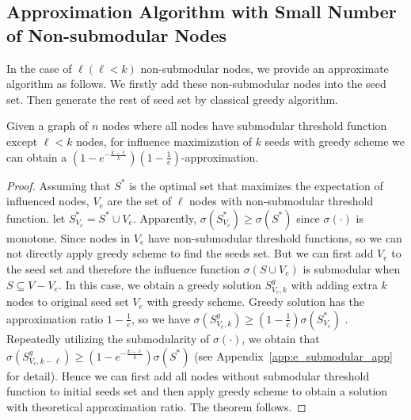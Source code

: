 \subsection{Approximation Algorithm with Small Number of Non-submodular Nodes}
In the case of $\ell (\ell<k)$ non-submodular nodes, we provide an approximate algorithm as follows. We firstly add these non-submodular nodes into the seed set. Then generate the rest of seed set by classical greedy algorithm.
\begin{theorem}\label{the:naive_greedy}
Given a graph of $n$ nodes where all nodes have submodular threshold function except $\ell < k$ nodes,
for influence maximization of $k$ seeds
with greedy scheme we can obtain a $(1-e^{-\frac{k-\ell}{k}})(1-\frac{1}{e})$-approximation.
\end{theorem}
\begin{proof}
Assuming that $S^*$ is the optimal set that maximizes the expectation of influenced nodes,
$V_e$ are the set of $\ell$ nodes with non-submodular threshold function.
let $S^*_{V_e} = S^* \cup V_e$.
Apparently, $\sigma(S^*_{V_e}) \geq \sigma(S^*)$ since $\sigma(\cdot)$ is monotone.
Since nodes in $V_e$ have non-submodular threshold functions, so we can not directly apply greedy scheme to find the seeds set.
But we can first add $V_e$ to the seed set and
therefore the influence function $\sigma(S\cup V_e)$ is submodular when $S \subseteq V-V_e$.
In this case, we obtain a greedy solution $S^g_{V_e,k}$ with adding extra $k$ nodes to original seed set $V_e$ with greedy scheme.
Greedy solution has the approximation ratio $1-\frac{1}{e}$, so we have $\sigma(S^g_{V_e,k}) \geq (1-\frac{1}{e})\sigma(S^*_{V_e})$ .
Repeatedly utilizing the submodularity of $\sigma(\cdot)$,
we obtain that $\sigma(S^g_{V_e,k-\ell})
\geq (1-e^{-\frac{k-\ell}{k}}) \sigma(S^*)$ (see Appendix~\ref{app:e_submodular_app} for detail).
Hence we can first add all nodes without submodular threshold function to initial seeds set and then apply greedy scheme to obtain a solution with theoretical approximation ratio.
The theorem follows.
\end{proof}

